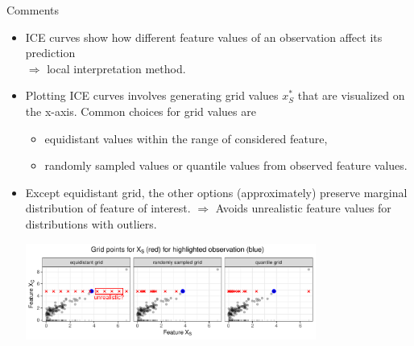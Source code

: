\documentclass[11pt,compress,t,notes=noshow, aspectratio=169, xcolor=table]{beamer}
\begin{document}
\begin{frame}{Comments}
\begin{itemize}
\item ICE curves show how different feature values of an observation affect its prediction \\ $\Rightarrow$ local interpretation method.
\item Plotting ICE curves involves generating grid values $x_S^*$ that are visualized on the x-axis.
Common choices for grid values are
\begin{itemize}
\item equidistant values within the range of considered feature,
\item randomly sampled values or quantile values from observed feature values.
\end{itemize}
\item Except equidistant grid, the other options (approximately) preserve marginal distribution of feature of interest.
$\Rightarrow$ Avoids unrealistic feature values for distributions with outliers.

\vspace{3pt}
\centering
\includegraphics[width=0.75\textwidth, trim=0cm 0cm 0cm 0cm, clip]{figure/sampling}

\end{itemize}
\end{frame}

\endlecture
\end{document}
